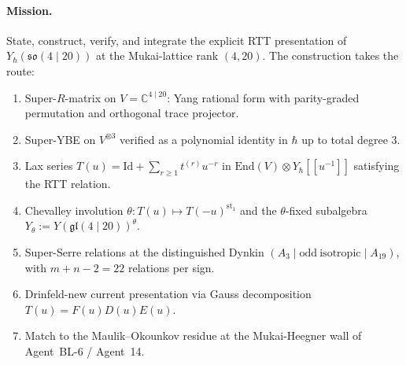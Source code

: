 \documentclass{article}
\providecommand{\C}{\mathbb C}
\providecommand{\fgl}{\mathfrak{gl}}
\providecommand{\fso}{\mathfrak{so}}
\providecommand{\End}{\mathrm{End}}
\providecommand{\Id}{\mathrm{Id}}
\theoremstyle{definition}
\begin{document}
\paragraph{Mission.}
State, construct, verify, and integrate the explicit RTT presentation
of $Y_\hbar(\fso(4 \mid 20))$ at the Mukai-lattice rank $(4, 20)$.
The construction takes the route:
\begin{enumerate}[label=(\alph*)]
\item Super-$R$-matrix on $V = \C^{4 \mid 20}$: Yang rational form
  with parity-graded permutation and orthogonal trace projector.
\item Super-YBE on $V^{\otimes 3}$ verified as a polynomial identity
  in $\hbar$ up to total degree $3$.
\item Lax series $T(u) = \Id + \sum_{r \geq 1} t^{(r)} u^{-r}$ in
  $\End(V) \otimes Y_\hbar[[u^{-1}]]$ satisfying the RTT relation.
\item Chevalley involution $\theta\colon T(u) \mapsto T(-u)^{\mathrm{st}_1}$
  and the $\theta$-fixed subalgebra $Y_\theta :=
  Y(\fgl(4 \mid 20))^\theta$.
\item Super-Serre relations at the distinguished Dynkin
  $(A_3 \mid \mathrm{odd\ isotropic} \mid A_{19})$, with $m + n - 2 =
  22$ relations per sign.
\item Drinfeld-new current presentation via Gauss decomposition
  $T(u) = F(u) D(u) E(u)$.
\item Match to the Maulik--Okounkov residue at the Mukai-Heegner wall
  of Agent~BL-6 / Agent~14.
\end{enumerate}
\end{document}
